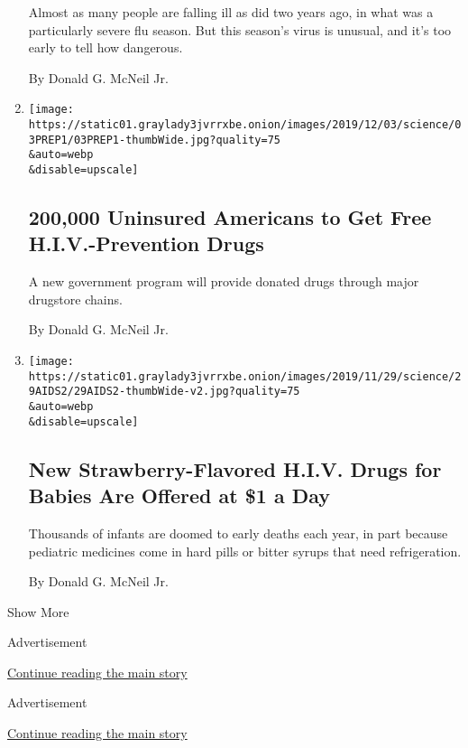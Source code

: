 \begin{enumerate}
  Almost as many people are falling ill as did two years ago, in what
  was a particularly severe flu season. But this season's virus is
  unusual, and it's too early to tell how dangerous.

  By Donald G. McNeil Jr.
\item
  \href{/2019/12/03/health/truvada-prep-hiv-gilead.html}{}

  \texttt{[image: https://static01.graylady3jvrrxbe.onion/images/2019/12/03/science/03PREP1/03PREP1-thumbWide.jpg?quality=75\\\&auto=webp\\\&disable=upscale]}

  \hypertarget{200000-uninsured-americans-to-get-free-hiv-prevention-drugs}{%
  \subsection{200,000 Uninsured Americans to Get Free H.I.V.-Prevention
  Drugs}\label{200000-uninsured-americans-to-get-free-hiv-prevention-drugs}}

  A new government program will provide donated drugs through major
  drugstore chains.

  By Donald G. McNeil Jr.
\item
  \href{/2019/11/29/health/AIDS-drugs-children.html}{}

  \texttt{[image: https://static01.graylady3jvrrxbe.onion/images/2019/11/29/science/29AIDS2/29AIDS2-thumbWide-v2.jpg?quality=75\\\&auto=webp\\\&disable=upscale]}

  \hypertarget{new-strawberry-flavored-hiv-drugs-for-babies-are-offered-at-1-a-day}{%
  \subsection{New Strawberry-Flavored H.I.V. Drugs for Babies Are
  Offered at \$1 a
  Day}\label{new-strawberry-flavored-hiv-drugs-for-babies-are-offered-at-1-a-day}}

  Thousands of infants are doomed to early deaths each year, in part
  because pediatric medicines come in hard pills or bitter syrups that
  need refrigeration.

  By Donald G. McNeil Jr.
\end{enumerate}

Show More

Advertisement

\protect\hyperlink{after-mid1}{Continue reading the main story}

Advertisement

\protect\hyperlink{after-mktg}{Continue reading the main story}

